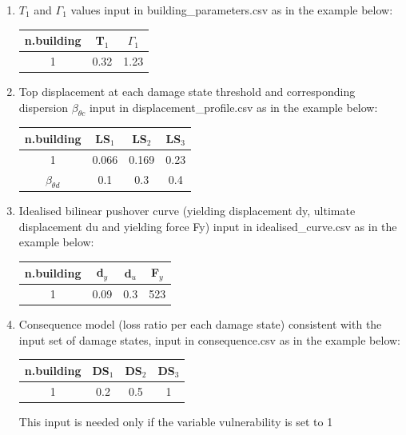 \begin{enumerate}
\item $T_1$ and $\Gamma_1$ values input in building\_parameters.csv as in the example below:
	\begin{table}[H]
	\centering
	\begin{tabular}{|c|c|c|} \hline
	\textbf{n.building} & \textbf{T$_1$} & \textbf{$\Gamma_1$} \\ \hline
	1 & 0.32 & 1.23\\ \hline
	\end{tabular}
	\end{table}
	
\item Top displacement at each damage state threshold and corresponding dispersion $\beta_{\theta c}$ input in displacement\_profile.csv as in the example below:
	\begin{table}[H]
	\centering
	\begin{tabular}{|c|c|c|c|} \hline
	\textbf{n.building} & \textbf{LS$_1$} &	\textbf{LS$_2$} &	\textbf{LS$_3$} \\ \hline
	1 & 0.066 & 0.169 & 0.23\\ \hline
	$\beta_{\theta d}$ & 0.1 & 0.3 & 0.4\\ \hline
	\end{tabular}
	\end{table}
	
\item Idealised bilinear pushover curve (yielding displacement dy, ultimate displacement du and yielding force Fy) input in idealised\_curve.csv as in the example below:
	\begin{table}[H]
	\centering
	\begin{tabular}{|c|c|c|c|} \hline
	\textbf{n.building} & \textbf{d$_y$} & \textbf{d$_u$} & \textbf{F$_y$} \\ \hline
	1 & 0.09	& 0.3	 & 523\\ \hline
	\end{tabular}
	\end{table}

\item Consequence model (loss ratio per each damage state) consistent with the input set of damage states, input in consequence.csv as in the example below:
	\begin{table}[H]
	\centering
	\begin{tabular}{|c|c|c|c|} \hline
	\textbf{n.building} & \textbf{DS$_1$} & \textbf{DS$_2$} & \textbf{DS$_3$} \\ \hline
	1 & 0.2	& 0.5	 & 1\\ \hline
	\end{tabular}
	\end{table}
This input is needed only if the variable vulnerability is set to 1			
\end{enumerate}

